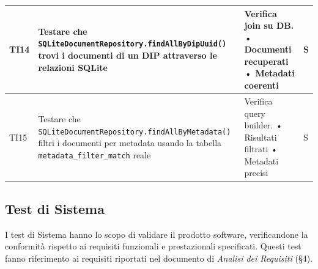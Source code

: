 \documentclass[a4paper,12pt]{article}
\begin{document}
\begin{longtable}{|M{1.2cm}|M{6.3cm}|M{5cm}|M{1.5cm}|}
            TI14 & Testare che \texttt{SQLiteDocumentRepository.findAllByDipUuid()} trovi i documenti di un DIP attraverso le relazioni SQLite & Verifica join su DB. \newline • Documenti recuperati \newline • Metadati coerenti & S \\ \hline
            
            TI15 & Testare che \texttt{SQLiteDocumentRepository.findAllByMetadata()} filtri i documenti per metadata usando la tabella \texttt{metadata\_filter\_match} reale & Verifica query builder. \newline • Risultati filtrati \newline • Metadati precisi & S \\ 
            \hline

        \end{longtable}


        \subsection{Test di Sistema}

        I test di Sistema hanno lo scopo di validare il prodotto software, verificandone la conformità rispetto ai requisiti funzionali e prestazionali specificati.
        Questi test fanno riferimento ai requisiti riportati nel documento di \textit{Analisi dei Requisiti} (\S4).
\end{document}
